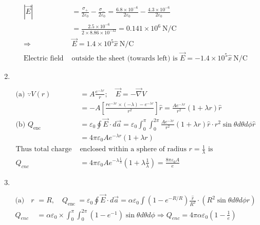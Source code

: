 \begin{enumerate}
\begin{answer}
\begin{align*}
	|\vec{E}|&=\frac{\sigma_{+}}{2 \varepsilon_{0}}-\frac{\sigma_{-}}{2 \varepsilon_{0}}=\frac{6.8 \times 10^{-6}}{2 \varepsilon_{0}}-\frac{4.3 \times 10^{-6}}{2 \varepsilon_{0}}\\&=\frac{2.5 \times 10^{-6}}{2 \times 8.86 \times 10^{-12}}=0.141 \times 10^{6} \mathrm{~N} / \mathrm{C} \\
	\Rightarrow & \vec{E}=1.4 \times 10^{5} \hat{x} \mathrm{~N} / \mathrm{C}\\
	\text{Electric field }&	\text{outside the sheet (towards left) is }\vec{E}=-1.4 \times 10^{5} \hat{x} \mathrm{~N} / \mathrm{C}
	\end{align*}
\end{answer}
\item $\left. \right. $
\begin{answer}
	\begin{align*}
\text{(a) }\because V(r)&=A \frac{e^{-\lambda r}}{r} ; \quad \vec{E}=-\vec{\nabla} V\\&=-A\left[\frac{r e^{-\lambda r} \times(-\lambda)-e^{-\lambda r}}{r^{2}}\right] \hat{r}=\frac{A e^{-\lambda r}}{r^{2}}(1+\lambda r) \hat{r}\\
	\text{(b) }Q_{\text {enc }}&=\varepsilon_{0} \oint \vec{E} \cdot d \vec{a}=\varepsilon_{0} \int_{0}^{\pi} \int_{0}^{2 \pi} \frac{A e^{-\lambda r}}{r^{2}}(1+\lambda r) \hat{r} \cdot r^{2} \sin \theta d \theta d \phi \hat{r}\\&=4 \pi \varepsilon_{0} A e^{-\lambda r}(1+\lambda r)\\
	\text{Thus total charge }&\text{enclosed within a sphere of radius }r=\frac{1}{\lambda}\text{ is }\\
	Q_{c n c}&=4 \pi \varepsilon_{0} A e^{-\lambda \frac{1}{\lambda}}\left(1+\lambda \frac{1}{\lambda}\right)=\frac{8 \pi \varepsilon_{0} A}{e}
	\end{align*}
\end{answer}
\item $\left. \right. $
\begin{answer}
	\begin{align*}
\text{(a) At }r&=R, \quad Q_{\text {enc }}=\varepsilon_{0} \oint \vec{E} \cdot d \vec{a}=\alpha \varepsilon_{0} \int\left(1-e^{-R / R}\right) \frac{\hat{r}}{R^{2}} \cdot\left(R^{2} \sin \theta d \theta d \phi \hat{r}\right)\\
	Q_{e n c}&=\alpha \varepsilon_{0} \times \int_{0}^{\pi} \int_{0}^{2 \pi}\left(1-e^{-1}\right) \sin \theta d \theta d \phi \Rightarrow Q_{e n c}=4 \pi \alpha \varepsilon_{0}\left(1-\frac{1}{e}\right) \\

\end{align*}
\end{answer}
\end{enumerate}
